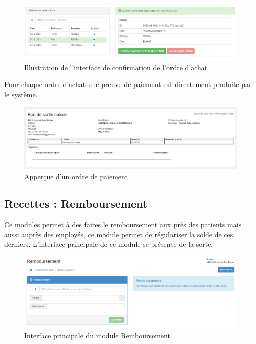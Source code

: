 \documentclass[12pt,a4paper]{report}
\begin{document}
\begin{figure}[h]
\begin{center}
\includegraphics[width=14cm]{pic/ConfOrdreAchat.png}
\end{center}
\caption{Illustration de l'interface de confirmation de l'ordre d'achat}
\label{Illustration de l'interface de confirmation de l'ordre d'achat}
\end{figure}

Pour chaque ordre d'achat une preuve de paiement est directement produite par le système.

\begin{figure}[h]
\begin{center}
\includegraphics[width=14cm]{pic/PreuvePaiement.png}
\end{center}
\caption{Apperçue d'un ordre de paiement}
\label{Apperçue d'un ordre de paiement}
\end{figure}

\newpage
\subsection{Recettes : Remboursement}
Ce modules permet à des faires le remboursement aux près des patients mais aussi auprès des employés, ce module permet de régulariser la solde de ces derniers. L'interface principale de ce module se présente de la sorte.

\begin{figure}[h]
\begin{center}
\includegraphics[width=14cm]{pic/remboursementMainInterface.png}
\end{center}
\caption{Interface principale du module Remboursement}
\label{Interface principale du module Remboursement}
\end{figure}
\end{document}
